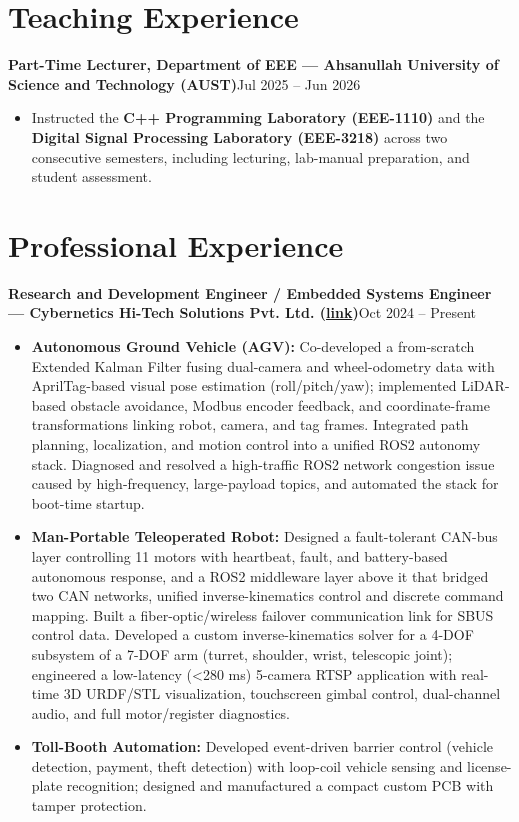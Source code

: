 \documentclass[10.5pt,letterpaper]{article}
\newcommand{\cvitem}[2]{%
  \noindent\textbf{#1}\hfill{#2}\par
}
\begin{document}
\section*{Teaching Experience}
\cvitem{Part-Time Lecturer, Department of EEE --- Ahsanullah University of Science and Technology (AUST)}{Jul 2025 -- Jun 2026}
\begin{itemize}
    \item Instructed the \textbf{C++ Programming Laboratory (EEE-1110)} and the \textbf{Digital Signal Processing Laboratory (EEE-3218)} across two consecutive semesters, including lecturing, lab-manual preparation, and student assessment.
\end{itemize}

\newpage
\section*{Professional Experience}

\cvitem{Research and Development Engineer / Embedded Systems Engineer --- Cybernetics Hi-Tech Solutions Pvt. Ltd. \normalfont\small(\href{https://www.youtube.com/@CyberneticsHi-Tech}{link})}{Oct 2024 -- Present}
\begin{itemize}
    \item \textbf{Autonomous Ground Vehicle (AGV):} Co-developed a from-scratch Extended Kalman Filter fusing dual-camera and wheel-odometry data with AprilTag-based visual pose estimation (roll/pitch/yaw); implemented LiDAR-based obstacle avoidance, Modbus encoder feedback, and coordinate-frame transformations linking robot, camera, and tag frames. Integrated path planning, localization, and motion control into a unified ROS2 autonomy stack. Diagnosed and resolved a high-traffic ROS2 network congestion issue caused by high-frequency, large-payload topics, and automated the stack for boot-time startup.
    \item \textbf{Man-Portable Teleoperated Robot:} Designed a fault-tolerant CAN-bus layer controlling 11 motors with heartbeat, fault, and battery-based autonomous response, and a ROS2 middleware layer above it that bridged two CAN networks, unified inverse-kinematics control and discrete command mapping. Built a fiber-optic/wireless failover communication link for SBUS control data. Developed a custom inverse-kinematics solver for a 4-DOF subsystem of a 7-DOF arm (turret, shoulder, wrist, telescopic joint); engineered a low-latency (\textless280 ms) 5-camera RTSP application with real-time 3D URDF/STL visualization, touchscreen gimbal control, dual-channel audio, and full motor/register diagnostics.
    \item \textbf{Toll-Booth Automation:} Developed event-driven barrier control (vehicle detection, payment, theft detection) with loop-coil vehicle sensing and license-plate recognition; designed and manufactured a compact custom PCB with tamper protection.
\end{itemize}
\end{document}
